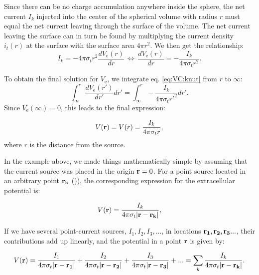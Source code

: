 Since there can be no charge accumulation anywhere inside the sphere, the net current $I_k$ injected into the center of the spherical volume with radius $r$ must equal the net current leaving through the surface of the volume. The net current leaving the surface can in turn be found by multiplying the current density $i_t(r)$ at the surface with the surface area $4\pi r^2$. We then get the relationship:
\begin{equation}
I_k = -4\pi \sigma_t r^2  \frac{dV_\mathrm{e}(r)}{dr} \, \iff \, \frac{dV_\mathrm{e}(r)}{dr} = -\frac{I_k}{4\pi \sigma_t r^2 }.
\label{eq:VC:knut}
\end{equation}

To obtain the final solution for $V_\mathrm{e}$, we integrate eq. \ref{eq:VC:knut} from $r$ to $\infty$:
\begin{equation}
\int_{\infty}^r \frac{dV_\mathrm{e}(r')}{dr'} dr' = \int_{\infty}^r -\frac{I_k}{4\pi \sigma_t r'^2 } dr'.
\label{eq:VC:knut2}
\end{equation}
Since $V_\mathrm{e}({\infty}) = 0$, this leads to the final expression:

\begin{equation}
V({\bf r}) = V(r) = \frac{I_k}{4\pi \sigma_t r},
\label{eq:VC:pointsource}
\end{equation}
where $r$ is the distance from the source.

In the example above, we made things mathematically simple by assuming that the current source was placed in the origin ${\bf r} = 0$. For a point source located in an arbitrary point ${\bf r_k} $ ()), the corresponding expression for the extracellular potential is:

\begin{equation}
V({\bf r}) = \frac{I_k}{4\pi \sigma_t |{\bf r-r_k}|},
\label{eq:VC:pointsource2}
\end{equation}

If we have several point-current sources, $I_{1}, I_2, I_3, ... $, in locations ${\bf r_1}, {\bf r_2}, {\bf r_3} ... $, their contributions add up linearly, and the potential in a point ${\bf r}$ is given by:

\begin{equation}
V({\bf r}) = \frac{I_1}{4\pi  \sigma_t {\bf |r-r_1|}} + \frac{I_2}{4\pi  \sigma_t {\bf |r-r_2|} } + \frac{I_3}{4\pi  \sigma_t {\bf |r-r_3|} } + ... = \sum_k \frac{I_k}{4\pi  \sigma_t {\bf |r-r_k|} }.
\label{eq:VC:pointsources}
\end{equation}

